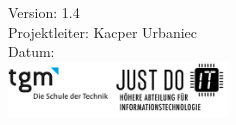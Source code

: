 \documentclass[minted, notitle]{protocol}
\newcommand{\theversion}{1.4} %
\newcommand{\leader}{Kacper Urbaniec} %
\begin{document}
\begin{titlepage}
{		{\vspace{0.3cm}\large Version: \theversion}\\ [0.5\baselineskip] %
		{\large Projektleiter: \leader}\\ [0.5\baselineskip] %
		{\large Datum: \thedate}\\ [1\baselineskip] %
		
		
		{\includegraphics[width=220]{images/tgm_full.png}}
	}
\end{titlepage}




\clearpage
{ %
  \hypersetup{linkcolor=black}
  \tableofcontents
} 
\clearpage

\end{document}
